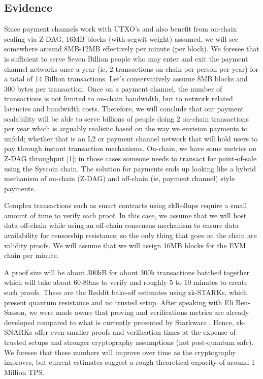 \documentclass[peerreview]{ieeesyscoin}
\begin{document}
\subsection{Evidence}

Since payment channels work with UTXO’s and also benefit from on-chain scaling via Z-DAG, 16MB blocks (with segwit weight) assumed, we will see somewhere around 8MB-12MB effectively per minute (per block). We foresee that is sufficient to serve Seven Billion people who may enter and exit the payment channel networks once a year (ie, 2 transactions on chain per person per year) for a total of 14 Billion transactions. Let’s conservatively assume 8MB blocks and 300 bytes per transaction. Once on a payment channel, the number of transactions is not limited to on-chain bandwidth, but to network related latencies and bandwidth costs. Therefore, we will conclude that our payment scalability will be able to serve billions of people doing 2 on-chain transactions per year which is arguably realistic based on the way we envision payments to unfold; whether that is an L2 or payment channel network that will hold users to pay through instant transaction mechanisms. On-chain, we have some metrics on Z-DAG throughput [1]; in those cases someone needs to transact for point-of-sale using the Syscoin chain. The solution for payments ends up looking like a hybrid mechanism of on-chain (Z-DAG) and off-chain (ie, payment channel) style payments.

Complex transactions such as smart contracts using zkRollups require a small amount of time to verify each proof. In this case, we assume that we will host data off-chain while using an off-chain consensus mechanism to ensure data availability for censorship resistance; so the only thing that goes on the chain are validity proofs. We will assume that we will assign 16MB blocks for the EVM chain per minute. 

A proof size will be about 300kB for about 300k transactions batched together which will take about 60-80ms to verify and roughly 5 to 10 minutes to create such proofs. These are the Reddit bake-off estimates using zk-STARKs, which present quantum resistance and no trusted setup. After speaking with Eli Ben-Sasson, we were made aware that  proving and verifications metrics are already developed compared to  what is  currently presented by Starkware \cite{Sta20}. Hence, zk-SNARKs offer even smaller proofs and verification times at the expense of trusted setups and stronger cryptography assumptions (not post-quantum safe). We foresee that these numbers will improve over time as the cryptography improves, but current estimates suggest a rough theoretical capacity of around 1 Million TPS. 
\end{document}
